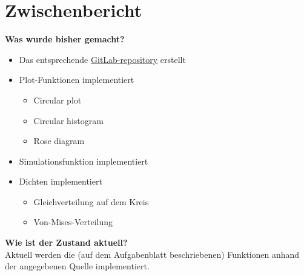 \documentclass{scrartcl}
\begin{document}
\section*{Zwischenbericht}
\noindent\textbf{Was wurde bisher gemacht?}
\begin{itemize}
	\item Das entsprechende \href{https://gitlab.com/Jan-Agatz/circulardata}{GitLab-repository} erstellt
	\item Plot-Funktionen implementiert
	\begin{itemize}
			\item Circular plot
			\item Circular histogram
			\item Rose diagram
		  \end{itemize}
	\item Simulationsfunktion implementiert
	\item Dichten implementiert
	\begin{itemize}
		\item Gleichverteilung auf dem Kreis
		\item Von-Mises-Verteilung
	\end{itemize}
\end{itemize}


\noindent\textbf{Wie ist der Zustand aktuell?} \\
\noindent Aktuell werden die (auf dem Aufgabenblatt beschriebenen) Funktionen anhand der angegebenen Quelle implementiert. \\

\end{document}
